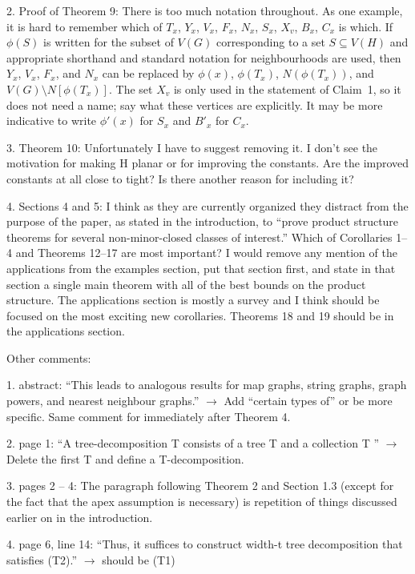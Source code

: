 \documentclass[12pt]{article}
\begin{document}
2. Proof of Theorem 9: There is too much notation throughout. As
one example, it is hard to remember which of $T_x$, $Y_x$, $V_x$, $F_x$, $N_x$,
$S_x$, $X_v$, $B_x$, $C_x$ is which. If $\phi(S)$ is written for the subset of $V(G)$
corresponding to a set $S \subseteq V(H)$ and appropriate shorthand and
standard notation for neighbourhoods are used, then $Y_x$, $V_x$, $F_x$, and
$N_x$ can be replaced by $\phi(x)$, $\phi(T_x)$, $N(\phi(T_x))$, and $V(G) \setminus N[\phi(T_x)]$.
The set $X_v$ is only used in the statement of Claim~1, so it does not
need a name; say what these vertices are explicitly. It may be more
indicative to write $\phi'(x)$ for $S_x$ and $B'_x$ for $C_x$.

3. Theorem 10: Unfortunately I have to suggest removing it. I don’t see
the motivation for making H planar or for improving the constants.
Are the improved constants at all close to tight? Is there another
reason for including it?

4. Sections 4 and 5: I think as they are currently organized they distract from the purpose of the paper, as stated in the introduction, to
“prove product structure theorems for several non-minor-closed classes
of interest.” Which of Corollaries 1–4 and Theorems 12–17 are most
important? I would remove any mention of the applications from the
examples section, put that section first, and state in that section a single main theorem with all of the best bounds on the product structure.
The applications section is mostly a survey and I think should be
focused on the most exciting new corollaries. Theorems 18 and 19
should be in the applications section.

Other comments:

1. abstract: “This leads to analogous results for map graphs, string graphs, graph powers, and nearest neighbour graphs.” $\longrightarrow$ Add “certain types of” or be more specific. Same comment for immediately after Theorem 4.

2. page 1: “A tree-decomposition T consists of a tree T and a collection
T ” $\longrightarrow$ Delete the first T and define a T-decomposition.

3. pages 2 – 4: The paragraph following Theorem 2 and Section 1.3
(except for the fact that the apex assumption is necessary) is repetition
of things discussed earlier on in the introduction.

4. page 6, line 14: “Thus, it suffices to construct width-t tree decomposition that satisfies (T2).” $\longrightarrow$ should be (T1)
\end{document}
